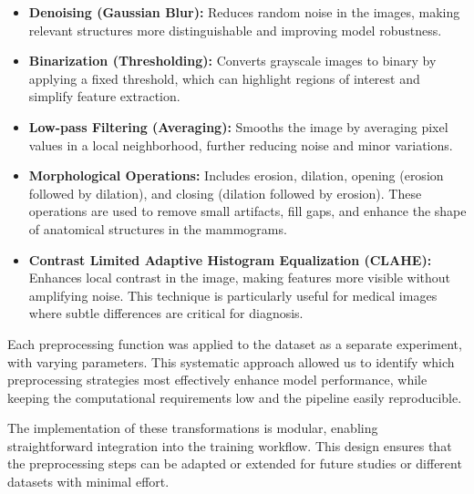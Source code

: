 \documentclass[12pt]{article}
\begin{document}
\begin{itemize}
    \item \textbf{Denoising (Gaussian Blur):} Reduces random noise in the images, making relevant structures more distinguishable and improving model robustness.
    \item \textbf{Binarization (Thresholding):} Converts grayscale images to binary by applying a fixed threshold, which can highlight regions of interest and simplify feature extraction.
    \item \textbf{Low-pass Filtering (Averaging):} Smooths the image by averaging pixel values in a local neighborhood, further reducing noise and minor variations.
    \item \textbf{Morphological Operations:} Includes erosion, dilation, opening (erosion followed by dilation), and closing (dilation followed by erosion). These operations are used to remove small artifacts, fill gaps, and enhance the shape of anatomical structures in the mammograms.
    \item \textbf{Contrast Limited Adaptive Histogram Equalization (CLAHE):} Enhances local contrast in the image, making features more visible without amplifying noise. This technique is particularly useful for medical images where subtle differences are critical for diagnosis.
\end{itemize}

Each preprocessing function was applied to the dataset as a separate experiment, with varying parameters. This systematic approach allowed us to identify which preprocessing strategies most effectively enhance model performance, while keeping the computational requirements low and the pipeline easily reproducible.

The implementation of these transformations is modular, enabling straightforward integration into the training workflow. This design ensures that the preprocessing steps can be adapted or extended for future studies or different datasets with minimal effort.
\end{document}
